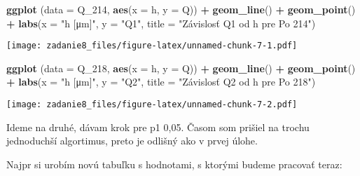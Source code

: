 \documentclass[]{article}
\newenvironment{Shaded}{\begin{snugshade}}{\end{snugshade}}
\newcommand{\DataTypeTok}[1]{\textcolor[rgb]{0.13,0.29,0.53}{#1}}
\newcommand{\DecValTok}[1]{\textcolor[rgb]{0.00,0.00,0.81}{#1}}
\newcommand{\KeywordTok}[1]{\textcolor[rgb]{0.13,0.29,0.53}{\textbf{#1}}}
\newcommand{\NormalTok}[1]{#1}
\newcommand{\OperatorTok}[1]{\textcolor[rgb]{0.81,0.36,0.00}{\textbf{#1}}}
\newcommand{\StringTok}[1]{\textcolor[rgb]{0.31,0.60,0.02}{#1}}
\begin{document}
\begin{Shaded}
\begin{Highlighting}[]
\KeywordTok{ggplot}\NormalTok{ (}\DataTypeTok{data =}\NormalTok{ Q_}\DecValTok{214}\NormalTok{, }\KeywordTok{aes}\NormalTok{(}\DataTypeTok{x =}\NormalTok{ h, }\DataTypeTok{y =}\NormalTok{ Q)) }\OperatorTok{+}\StringTok{ }\KeywordTok{geom_line}\NormalTok{() }\OperatorTok{+}\StringTok{ }\KeywordTok{geom_point}\NormalTok{() }\OperatorTok{+}\StringTok{ }\KeywordTok{labs}\NormalTok{(}\DataTypeTok{x =} \StringTok{"h [μm]"}\NormalTok{, }\DataTypeTok{y =} \StringTok{"Q1"}\NormalTok{,  }\DataTypeTok{title =} \StringTok{"Závislosť Q1 od h pre Po 214"}\NormalTok{)}
\end{Highlighting}
\end{Shaded}

\texttt{[image: zadanie8\_files/figure-latex/unnamed-chunk-7-1.pdf]}

\begin{Shaded}
\begin{Highlighting}[]
\KeywordTok{ggplot}\NormalTok{ (}\DataTypeTok{data =}\NormalTok{ Q_}\DecValTok{218}\NormalTok{, }\KeywordTok{aes}\NormalTok{(}\DataTypeTok{x =}\NormalTok{ h, }\DataTypeTok{y =}\NormalTok{ Q)) }\OperatorTok{+}\StringTok{ }\KeywordTok{geom_line}\NormalTok{() }\OperatorTok{+}\StringTok{ }\KeywordTok{geom_point}\NormalTok{() }\OperatorTok{+}\StringTok{ }\KeywordTok{labs}\NormalTok{(}\DataTypeTok{x =} \StringTok{"h [μm]"}\NormalTok{, }\DataTypeTok{y =} \StringTok{"Q2"}\NormalTok{,  }\DataTypeTok{title =} \StringTok{"Závislosť Q2 od h pre Po 218"}\NormalTok{)}
\end{Highlighting}
\end{Shaded}

\texttt{[image: zadanie8\_files/figure-latex/unnamed-chunk-7-2.pdf]}

Ideme na druhé, dávam krok pre p1 0,05. Časom som prišiel na trochu
jednoduchší algortimus, preto je odlišný ako v prvej úlohe.

Najpr si urobím novú tabuľku s hodnotami, s ktorými budeme pracovať
teraz:

\begin{Shaded}
\end{Shaded}
\end{document}
